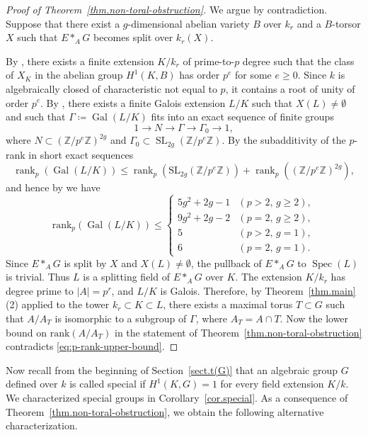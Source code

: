 \documentclass[12pt]{amsart}
\numberwithin{equation}{section}
\theoremstyle{remark}
\newcommand{\on}{\operatorname}
\begin{document}
\begin{proof}[Proof of Theorem~\ref{thm.non-toral-obstruction}]
We argue by contradiction. Suppose that there exist a $g$-dimensional abelian variety $B$ over $k_r$ and a $B$-torsor $X$ such that $E*_AG$ becomes split over $k_r(X)$. 

By \cite[Lemma 6.1]{genus1}, there exists a finite extension $K/k_r$ of prime-to-$p$ degree such that the class of $X_{K}$ in the abelian group $H^1(K,B)$ has order $p^e$ for some $e\geqslant 0$. Since $k$ is algebraically closed of characteristic not equal to $p$, it contains a root of unity of order $p^e$. By \cite[Proposition 3.1]{genus1}, there exists a finite Galois extension $L/K$ such that $X(L)\neq \emptyset$ and such that $\Gamma\coloneqq \operatorname{Gal}(L/K)$ fits into an exact sequence of finite groups
\[
        1\longrightarrow N\longrightarrow \Gamma\longrightarrow \Gamma_0
        \longrightarrow 1,
\]
where $N\subset (\mathbb Z/p^e\mathbb Z)^{2g}$ and $\Gamma_0\subset \operatorname{SL}_{2g}(\mathbb Z/p^e\mathbb Z)$. By the subadditivity of the $p$-rank in short exact sequences
		\[\on{rank}_p(\on{Gal}(L/K)) \leqslant \on{rank}_p(\mathrm{SL}_{2g}(\mathbb{Z}/p^e\mathbb{Z}))+\on{rank}_p((\mathbb{Z}/p^e\mathbb{Z})^{2g}),\]
		and hence by \cite[Corollary 4.4]{genus1} we have
		\begin{equation}\label{eq:p-rank-upper-bound}
		\mathrm{rank}_p(\on{Gal}(L/K)) \leqslant
		\begin{cases}
			5g^2 +2g-1 & (p>2,\, g\geqslant 2), \\
			9g^2 + 2g-2 & (p = 2,\, g\geqslant 2), \\
			5 & (p>2,\, g=1), \\
			6 & (p=2,\, g=1).
		\end{cases}
		\end{equation}
Since $E*_AG$ is split by $X$ and $X(L)\neq \emptyset$, the pullback of $E*_AG$ to $\operatorname{Spec}(L)$ is trivial. Thus $L$ is a splitting field of $E*_AG$ over $K$. The extension $K/k_r$ has degree prime to $|A|=p^r$, and $L/K$ is Galois. Therefore, by Theorem~\ref{thm.main}(2) applied to the tower $k_r\subset K\subset L$, there exists a maximal torus $T\subset G$ such that $A/A_T$ is isomorphic to a subgroup of $\Gamma$, where $A_T=A\cap T$. Now the lower bound on $\mathrm{rank}(A/A_T)$ in the statement of Theorem~\ref{thm.non-toral-obstruction} contradicts \eqref{eq:p-rank-upper-bound}.
\end{proof}

Now recall from the beginning of Section~\ref{sect.t(G)} that an algebraic group $G$ defined over $k$ is called special if $H^1(K, G) = 1$ for every field extension $K/k$. We characterized special groups in Corollary~\ref{cor.special}.
As a consequence of Theorem~\ref{thm.non-toral-obstruction}, we obtain the following alternative characterization.
\end{document}
